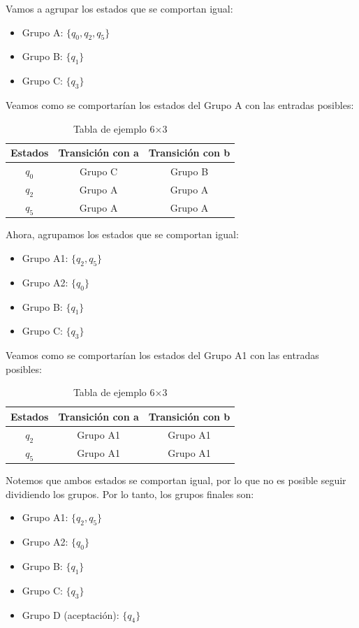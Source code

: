  Vamos a agrupar los estados que se comportan igual:
 \begin{itemize}
    \item Grupo A: $\{q_0, q_2, q_5\}$
    \item Grupo B: $\{q_1\}$
    \item Grupo C: $\{q_3\}$
 \end{itemize}
    Veamos como se comportarían los estados del Grupo A con las entradas posibles:      
    \begin{table}[H]
    \centering      
    \begin{tabular}{|c|c|c|}
    \hline
    \textbf{Estados} & \textbf{Transición con a} & \textbf{Transición con b } \\
    \hline
    $q_0$ & Grupo C & Grupo B\\     
    \hline
    $q_2$  & Grupo A & Grupo A \\       
    \hline
    $q_5$ & Grupo A & Grupo A \\    
    \hline
    \end{tabular}       
    \caption{Tabla de ejemplo 6×3}
    \label{tab:ejemplo}
    \end{table} 
    Ahora, agrupamos los estados que se comportan igual:
    \begin{itemize}     
        \item Grupo A1: $\{q_2, q_5\}$
        \item Grupo A2: $\{q_0\}$
        \item Grupo B: $\{q_1\}$
        \item Grupo C: $\{q_3\}$
    \end{itemize}
    Veamos como se comportarían los estados del Grupo A1 con las entradas posibles:      
    \begin{table}[H]        
    \centering      
    \begin{tabular}{|c|c|c|}        
    \hline
    \textbf{Estados} & \textbf{Transición con a} & \textbf{Transición con b } \\
    \hline
    $q_2$  & Grupo A1 & Grupo A1 \\ 
    \hline
    $q_5$ & Grupo A1 & Grupo A1 \\  
    \hline
    \end{tabular}       
    \caption{Tabla de ejemplo 6×3}
    \label{tab:ejemplo} 
    \end{table}
    Notemos que ambos estados se comportan igual, por lo que no es posible seguir dividiendo los grupos. Por lo tanto, los grupos finales son:
    \begin{itemize} 
        \item Grupo A1: $\{q_2, q_5\}$
        \item Grupo A2: $\{q_0\}$
        \item Grupo B: $\{q_1\}$
        \item Grupo C: $\{q_3\}$
        \item Grupo D (aceptación): $\{q_4\}$   
    \end{itemize}
